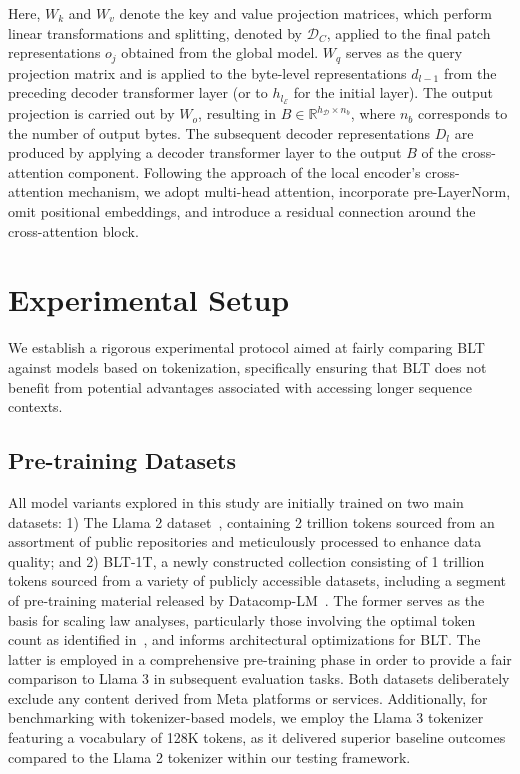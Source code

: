 Here, $W_k$ and $W_v$ denote the key and value projection matrices, which perform linear transformations and splitting, denoted by $\mathcal{D}_C$, applied to the final patch representations $o_j$ obtained from the global model. $W_q$ serves as the query projection matrix and is applied to the byte-level representations $d_{l-1}$ from the preceding decoder transformer layer (or to $h_{l_{\mathcal{E}}}$ for the initial layer). The output projection is carried out by $W_o$, resulting in $B \in \mathbb{R}^{h_{\mathcal{D}} \times n_b}$, where $n_b$ corresponds to the number of output bytes. The subsequent decoder representations $D_l$ are produced by applying a decoder transformer layer to the output $B$ of the cross-attention component. Following the approach of the local encoder’s cross-attention mechanism, we adopt multi-head attention, incorporate pre-LayerNorm, omit positional embeddings, and introduce a residual connection around the cross-attention block.

\section{Experimental Setup}
\label{section:experiments}
We establish a rigorous experimental protocol aimed at fairly comparing {\textsc BLT} against models based on tokenization, specifically ensuring that {\textsc BLT} does not benefit from potential advantages associated with accessing longer sequence contexts.

\subsection{Pre-training Datasets} All model variants explored in this study are initially trained on two main datasets: 1) The Llama 2 dataset~\citep{touvron2023llama}, containing 2 trillion tokens sourced from an assortment of public repositories and meticulously processed to enhance data quality; and 2) {\textsc BLT}-1T, a newly constructed collection consisting of 1 trillion tokens sourced from a variety of publicly accessible datasets, including a segment of pre-training material released by Datacomp-LM~\citep{li2024datacomp}. The former serves as the basis for scaling law analyses, particularly those involving the optimal token count as identified in~\cite{dubey2024llama}, and informs architectural optimizations for {\textsc BLT}. The latter is employed in a comprehensive pre-training phase in order to provide a fair comparison to Llama 3 in subsequent evaluation tasks. Both datasets deliberately exclude any content derived from Meta platforms or services. Additionally, for benchmarking with tokenizer-based models, we employ the Llama 3 tokenizer featuring a vocabulary of 128K tokens, as it delivered superior baseline outcomes compared to the Llama 2 tokenizer within our testing framework.

